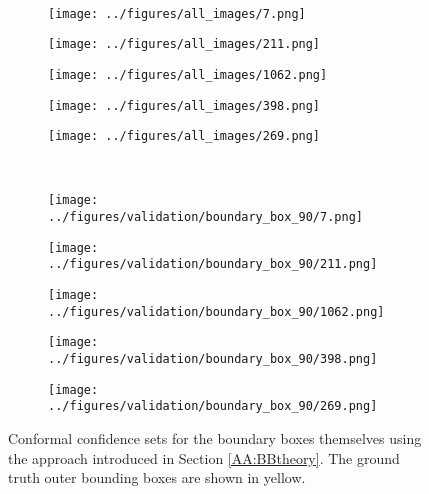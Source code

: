 \begin{figure}[h!]
\begin{subfigure}{0.19\textwidth}
		\label{fig:1}
	\end{subfigure}
	\vspace{-0.35cm}
	\\
	\begin{subfigure}{0.19\textwidth}
		\centering
		\texttt{[image: ../figures/all\_images/7.png]}
		\label{fig:1}
	\end{subfigure}
	\begin{subfigure}{0.19\textwidth}
		\centering
		\texttt{[image: ../figures/all\_images/211.png]}
		\label{fig:1}
	\end{subfigure}
	\begin{subfigure}{0.19\textwidth}
		\centering
		\texttt{[image: ../figures/all\_images/1062.png]}
		\label{fig:1}
	\end{subfigure}
	\begin{subfigure}{0.19\textwidth}
		\centering
		\texttt{[image: ../figures/all\_images/398.png]}
		\label{fig:1}
	\end{subfigure}
	\begin{subfigure}{0.19\textwidth}
		\centering
		\texttt{[image: ../figures/all\_images/269.png]}
		\label{fig:1}
	\end{subfigure}
	\vspace{-0.35cm}
	\\
	\begin{subfigure}{0.19\textwidth}
		\centering
		\texttt{[image: ../figures/validation/boundary\_box\_90/7.png]}
		\label{fig:1}
	\end{subfigure}
	\begin{subfigure}{0.19\textwidth}
		\centering
		\texttt{[image: ../figures/validation/boundary\_box\_90/211.png]}
		\label{fig:1}
	\end{subfigure}
	\begin{subfigure}{0.19\textwidth}
		\centering
		\texttt{[image: ../figures/validation/boundary\_box\_90/1062.png]}
		\label{fig:1}
	\end{subfigure}
	\begin{subfigure}{0.19\textwidth}
		\centering
		\texttt{[image: ../figures/validation/boundary\_box\_90/398.png]}
		\label{fig:1}
	\end{subfigure}
	\begin{subfigure}{0.19\textwidth}
		\centering
		\texttt{[image: ../figures/validation/boundary\_box\_90/269.png]}
		\label{fig:1}
	\end{subfigure}
	\label{fig:grid}
	\caption{Conformal confidence sets for the boundary boxes themselves using the approach introduced in Section \ref{AA:BBtheory}. The ground truth outer bounding boxes are shown in yellow.}\label{fig:resbb}
\end{figure}

